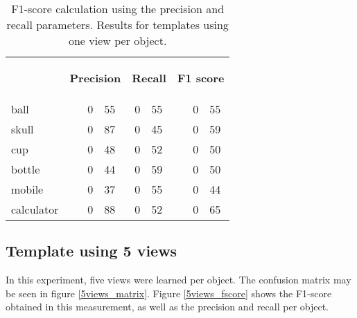 \begin{table}[H]
\centering
\begin{tabular} {l l r@{.}l r@{.}l l r@{.}l }
\toprule
\addlinespace[3mm]
   \multicolumn{1}{c}{\begin{center}\textbf{Object}\end{center}} &
   \multicolumn{3}{c}{\begin{flushright}\textbf{Precision}\end{flushright}} &
   \multicolumn{2}{c}{\begin{flushright}\textbf{Recall}\end{flushright}} &
   \multicolumn{3}{c}{\begin{flushright}\hspace*{0.2cm}\textbf{F1 score}\end{flushright}} &\\
\addlinespace[-3mm]
\midrule
ball		&&	0&55 	&	0&55	&&	0&55	\\
skull		&&	0&87	&	0&45	&&	0&59	\\
cup			&&	0&48	&	0&52	&&	0&50	\\
bottle		&&	0&44	&	0&59	&&	0&50	\\
mobile		&&	0&37	&	0&55	&&	0&44	\\
calculator	&&	0&88	&	0&52	&&	0&65	\\
\bottomrule
\end{tabular}
\caption[F1-score - templates using 1 view]{F1-score calculation using the precision and recall parameters. Results for templates using one view per object. }
\label{1view_fscore}

\end{table}




\subsection{Template using 5 views}
In this experiment, five views were learned per object. 
The confusion matrix may be seen in figure \ref{5views_matrix}. 
Figure \ref{5views_fscore} shows the F1-score obtained in this measurement, as well as the precision and recall per object. 

